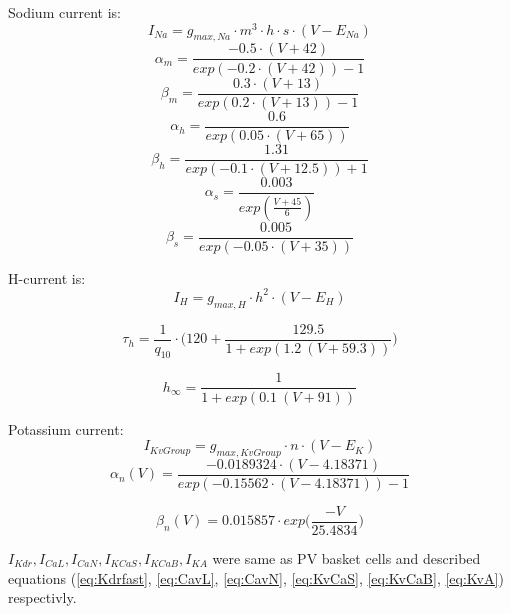\documentclass[12pt]{article}
\begin{document}
Sodium current is:
\begin{equation}
\label{eq:Navcck}
I_{Na} = g_{max, Na} \cdot m^3 \cdot h \cdot s \cdot (V - E_{Na})
\end{equation}
\begin{equation}
\alpha_m = \frac{-0.5 \cdot (V + 42)}{exp(-0.2\cdot(V+42)) - 1}
\end{equation}
\begin{equation}
\beta_m = \frac{0.3 \cdot (V + 13)}{exp(0.2\cdot(V+13)) - 1}
\end{equation}
\begin{equation}
\alpha_h = \frac{0.6}{exp(0.05\cdot(V+65))}
\end{equation}
\begin{equation}
\beta_h = \frac{1.31}{exp(-0.1\cdot(V+12.5)) + 1}
\end{equation}
\begin{equation}
\alpha_s = \frac{0.003}{exp( \frac{V+45}{6})}
\end{equation}
\begin{equation}
\beta_s = \frac{0.005}{exp(-0.05\cdot(V+35))}
\end{equation}

H-current is:
\begin{equation}
\label{eq:HCN}
I_{H} = g_{max, H} \cdot h^2 \cdot (V - E_{H})
\end{equation}

\begin{equation}
\tau_{h} = \frac{1}{q_{10}} \cdot \Bigg(120 + \frac{129.5}{1 + exp(1.2 \ (V + 59.3))} \Bigg)
\end{equation}

\begin{equation}
h_{\infty} =  \frac{1}{1 + exp(0.1 \ (V + 91))}
\end{equation}

Potassium current:
\begin{equation}
\label{eq:KvGroup}
I_{KvGroup} = g_{max, KvGroup} \cdot n \cdot (V - E_K)
\end{equation}
\begin{equation}
\alpha_n(V) = \frac{-0.0189324 \cdot (V - 4.18371) }{exp(-0.15562\cdot (V - 4.18371)) - 1}
\end{equation}

\begin{equation}
\beta_n(V) = 0.015857 \cdot exp \Big(\frac{-V}{25.4834}\Big)
\end{equation}


$ I_{Kdr}, I_{CaL}, I_{CaN},I_{KCaS}, I_{KCaB}, I_{KA}$ were same as PV basket cells and described equations (\ref{eq:Kdrfast}, \ref{eq:CavL}, \ref{eq:CavN}, \ref{eq:KvCaS}, \ref{eq:KvCaB}, \ref{eq:KvA}) respectivly.
\end{document}
